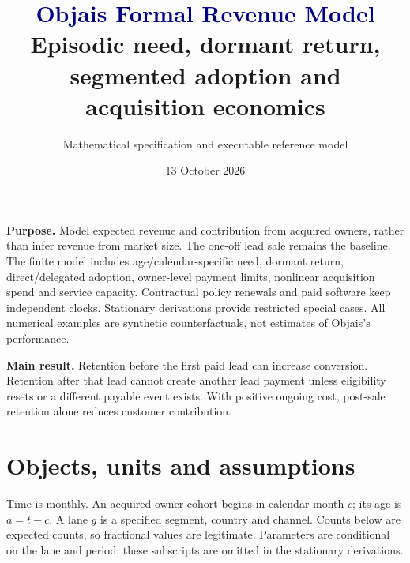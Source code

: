 \documentclass[11pt,a4paper]{article}
\title{\textcolor{navy}{Objais Formal Revenue Model}\\\large Episodic need, dormant return, segmented adoption and acquisition economics}
\author{Mathematical specification and executable reference model}
\date{13 October 2026}
\begin{document}
\maketitle

\textbf{Purpose.} Model expected revenue and contribution from acquired owners, rather than infer revenue from market size. The one-off lead sale remains the baseline. The finite model includes age/calendar-specific need, dormant return, direct/delegated adoption, owner-level payment limits, nonlinear acquisition spend and service capacity. Contractual policy renewals and paid software keep independent clocks. Stationary derivations provide restricted special cases. All numerical examples are synthetic counterfactuals, not estimates of Objais's performance.

\textbf{Main result.} Retention before the first paid lead can increase conversion. Retention after that lead cannot create another lead payment unless eligibility resets or a different payable event exists. With positive ongoing cost, post-sale retention alone reduces customer contribution.

\tableofcontents
\newpage

\section{Objects, units and assumptions}

Time is monthly. An acquired-owner cohort begins in calendar month $c$; its age is $a=t-c$. A lane $g$ is a specified segment, country and channel. Counts below are expected counts, so fractional values are legitimate. Parameters are conditional on the lane and period; these subscripts are omitted in the stationary derivations.
\end{document}
